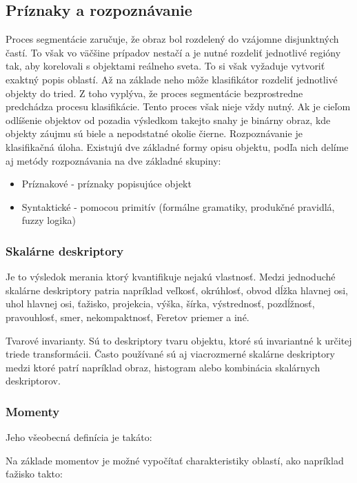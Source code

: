 \subsection{Príznaky a rozpoznávanie}
Proces segmentácie zaručuje, že obraz bol rozdelený do vzájomne disjunktných častí. To však vo väčšine prípadov nestačí a je nutné rozdeliť jednotlivé regióny tak, aby korelovali s objektami reálneho sveta. To si však vyžaduje vytvoriť exaktný popis oblastí. Až na základe neho môže klasifikátor rozdeliť jednotlivé objekty do tried.  Z toho vyplýva, že proces segmentácie bezprostredne predchádza procesu klasifikácie.  Tento proces však nieje vždy nutný. Ak je cieľom odlíšenie objektov od pozadia výsledkom takejto snahy je binárny obraz, kde objekty záujmu sú biele a nepodstatné okolie čierne.
Rozpoznávanie je klasifikačná úloha. Existujú dve základné formy opisu objektu, podľa nich delíme aj metódy rozpoznávania na dve základné skupiny: 

\begin{itemize}
\item Príznakové - príznaky popisujúce objekt 
\item Syntaktické - pomocou primitív (formálne gramatiky, produkčné pravidlá, fuzzy logika)
\end{itemize}

\subsubsection{Skalárne deskriptory}
Je to výsledok merania ktorý kvantifikuje nejakú vlastnosť. Medzi jednoduché skalárne deskriptory  patria napríklad veľkosť,  okrúhlosť, obvod dĺžka hlavnej osi, uhol hlavnej osi, ťažisko,  projekcia, výška, šírka, výstrednosť, pozdĺžnosť, pravouhlosť, smer, nekompaktnosť, Feretov priemer a iné. 

Tvarové invarianty. Sú to deskriptory tvaru objektu, ktoré sú invariantné k určitej triede transformácii.
Často používané sú aj viacrozmerné skalárne deskriptory medzi ktoré patrí napríklad obraz, histogram alebo kombinácia skalárnych deskriptorov.

\subsubsection{Momenty}

Jeho všeobecná definícia je takáto:

Na základe momentov je možné vypočítať charakteristiky oblastí, ako napríklad ťažisko takto: 


